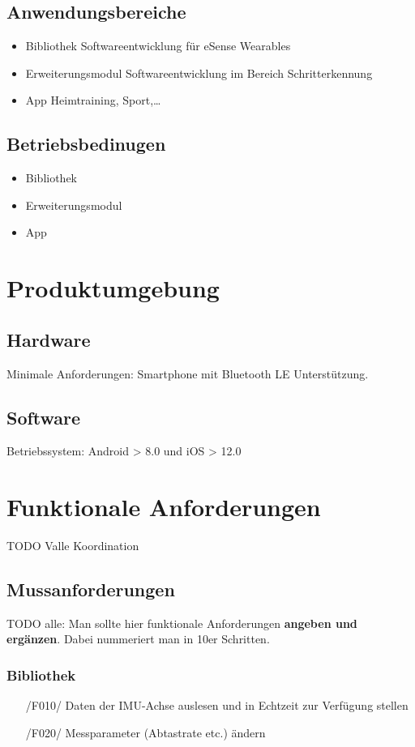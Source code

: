 \documentclass[a4paper,12pt]{article}
\begin{document}
  \subsection{Anwendungsbereiche}
    \begin{itemize}
      \item\textsf{Bibliothek} Softwareentwicklung für eSense Wearables
      \item\textsf{Erweiterungsmodul} Softwareentwicklung im Bereich Schritterkennung
      \item\textsf{App} Heimtraining, Sport,\dots
    \end{itemize}
  \subsection{Betriebsbedinugen}
    \begin{itemize}
      \item\textsf{Bibliothek} 
      \item\textsf{Erweiterungsmodul}
      \item\textsf{App}
    \end{itemize}

\section{Produktumgebung}
\subsection{Hardware} \textsf{Minimale Anforderungen:} Smartphone mit Bluetooth LE Unterstützung.
\subsection{Software} \textsf{Betriebssystem:} Android > 8.0 und iOS > 12.0

\section{Funktionale Anforderungen}
TODO Valle Koordination

  \subsection{Mussanforderungen}
  TODO alle: Man sollte hier funktionale Anforderungen \textbf{angeben und ergänzen}. Dabei nummeriert man in 10er Schritten.
    \subsubsection{Bibliothek}
    \begin{itemize}
      \item[/F010/] Daten der IMU-Achse auslesen und in Echtzeit zur Verfügung stellen
      \item[/F020/] Messparameter (Abtastrate etc.) ändern %
    \end{itemize}
\end{document}
